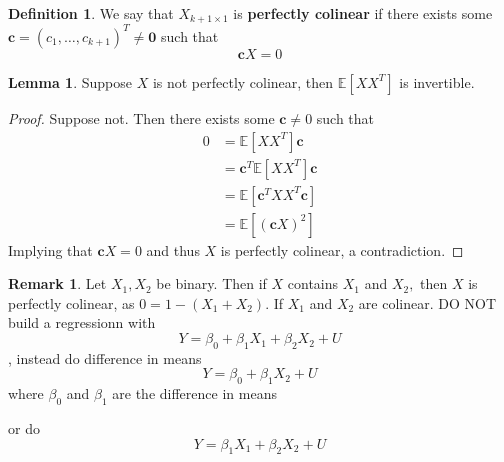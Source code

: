 \documentclass[10pt, oneside]{article}
\newcommand{\bbE}{\mathbb{E}}
\theoremstyle{definition}
\newtheorem{defn}{Definition}
\newtheorem{rem}{Remark}
\newtheorem{lem}{Lemma}
\begin{document}
\begin{defn}
    We say that $X_{k+1 \times 1}$ is \textbf{perfectly colinear} if there exists some $\textbf{c} = (c_1, \dots, c_{k+1})^T \neq \textbf{0}$ such that 
    \[\textbf{c}X = 0\]
\end{defn}
\begin{lem}
    Suppose $X$ is not perfectly colinear, then $\bbE[XX^T]$ is invertible. 
\end{lem}
\begin{proof}
    Suppose not. Then there exists some $\textbf{c}\neq 0 $ such that 
    \begin{align*}
        0 &= \bbE[XX^T]\textbf{c}\\
        &= \textbf{c}^T \bbE[XX^T]\textbf{c}\\
        &= \bbE[\textbf{c}^T XX^T\textbf{c}]\\
        &= \bbE[(\textbf{c}X)^2]
    \end{align*} Implying that $\textbf{c}X= 0$ and thus $X$ is perfectly colinear, a contradiction.
\end{proof}

\begin{rem}
    Let $X_1, X_2$ be binary. Then if $X$ contains $X_1$ and $X_2,$ then $X$ is perfectly colinear, as $0 = 1-(X_1 + X_2)$.     If $X_1$ and $X_2$ are colinear. DO NOT build a regressionn with 
    \[Y = \beta_0 + \beta_1 X_1 + \beta_2 X_2 + U\], instead do difference in means 
    \[Y = \beta_0 + \beta_1 X_2 + U\] where $\beta_0$ and $\beta_1$ are the difference in means
    
    or do 
    \[Y = \beta_1 X_1 + \beta_2 X_2 + U\]
\end{rem}




\newpage
\end{document}
